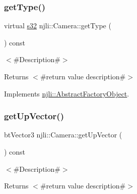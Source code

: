 \subsubsection{\texorpdfstring{get\+Type()}{getType()}}
{\footnotesize\ttfamily virtual \mbox{\hyperlink{_util_8h_aa62c75d314a0d1f37f79c4b73b2292e2}{s32}} njli\+::\+Camera\+::get\+Type (\begin{DoxyParamCaption}{ }\end{DoxyParamCaption}) const\hspace{0.3cm}{\ttfamily [virtual]}}

$<$\#\+Description\#$>$

\begin{DoxyReturn}{Returns}
$<$\#return value description\#$>$ 
\end{DoxyReturn}


Implements \mbox{\hyperlink{classnjli_1_1_abstract_factory_object_a207c86146d40d0794708ae7f2d4e60a7}{njli\+::\+Abstract\+Factory\+Object}}.

\mbox{\label{classnjli_1_1_camera_a3042125c6d21a4e239324637f94b43d8}} 
\subsubsection{\texorpdfstring{get\+Up\+Vector()}{getUpVector()}}
{\footnotesize\ttfamily bt\+Vector3 njli\+::\+Camera\+::get\+Up\+Vector (\begin{DoxyParamCaption}{ }\end{DoxyParamCaption}) const}

$<$\#\+Description\#$>$

\begin{DoxyReturn}{Returns}
$<$\#return value description\#$>$ 
\end{DoxyReturn}
\mbox{\label{classnjli_1_1_camera_a8a2fe20126d6962fc65b55328905acc0}} 
